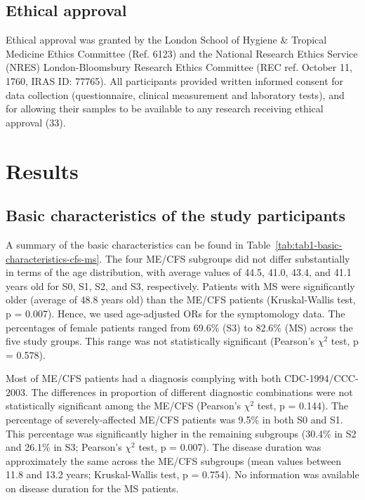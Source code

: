 \subsection{Ethical approval}

Ethical approval was granted by the London School of Hygiene \& Tropical Medicine Ethics Committee (Ref. 6123) and the National Research Ethics Service (NRES) London-Bloomsbury Research Ethics Committee (REC ref. October 11, 1760, IRAS ID: 77765). All participants provided written informed consent for data collection (questionnaire, clinical measurement and laboratory tests), and for allowing their samples to be available to any research receiving ethical approval (33).


\section{Results}

\subsection{Basic characteristics of the study participants}

A summary of the basic characteristics can be found in Table~\ref{tab:tab1-basic-characteristics-cfs-ms}. The four ME/CFS subgroups did not differ substantially in terms of the age distribution, with average values of 44.5, 41.0, 43.4, and 41.1 years old for S0, S1, S2, and S3, respectively. Patients with MS were significantly older (average of 48.8 years old) than the ME/CFS patients (Kruskal-Wallis test, p = 0.007). Hence, we used age-adjusted ORs for the symptomology data. The percentages of female patients ranged from 69.6\% (S3) to 82.6\% (MS) across the five study groups. This range was not statistically significant (Pearson's $\chi^2$ test, p = 0.578).

Most of ME/CFS patients had a diagnosis complying with both CDC-1994/CCC-2003. The differences in proportion of different diagnostic combinations were not statistically significant among the ME/CFS (Pearson's $\chi^2$ test, p = 0.144). The percentage of severely-affected ME/CFS patients was 9.5\% in both S0 and S1. This percentage was significantly higher in the remaining subgroups (30.4\% in S2 and 26.1\% in S3; Pearson's $\chi^2$ test, p = 0.007). The disease duration was approximately the same across the ME/CFS subgroups (mean values between 11.8 and 13.2 years; Kruskal-Wallis test, p = 0.754). No information was available on disease duration for the MS patients.

